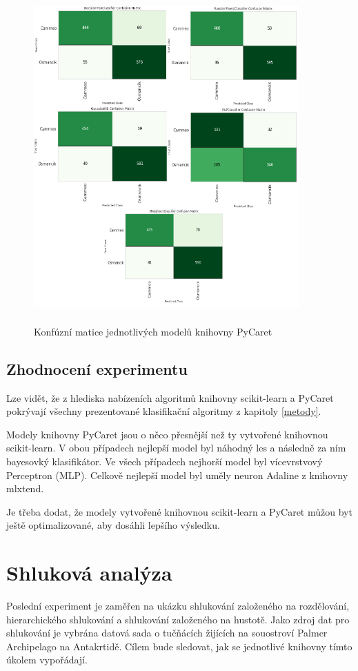\begin{figure}[h]\centering
  \centering
  \includegraphics[width=4in,height=4.7in]{obrazky/pycaretklf.pdf}\\[1pt]
  \caption{Konfúzní matice jednotlivých modelů knihovny PyCaret}
  \label{konfuznimaticepycaret}
\end{figure}

\subsection*{Zhodnocení experimentu}
Lze vidět, že z hlediska nabízeních algoritmů knihovny scikit-learn a PyCaret pokrývají všechny prezentované klasifikační algoritmy z kapitoly \ref{metody}. 

Modely knihovny PyCaret jsou o něco přesnější než ty vytvořené knihovnou scikit-learn. V obou případech nejlepší model byl náhodný les a následně za ním bayesovký klasifikátor. Ve všech případech nejhorší model byl vícevrstvový Perceptron (MLP). Celkově nejlepší model byl uměly neuron Adaline z knihovny mlxtend. 

Je třeba dodat, že modely vytvořené knihovnou scikit-learn a PyCaret můžou byt ještě optimalizované, aby dosáhli lepšího výsledku.

\section{Shluková analýza}
\label{shlukovanalyza}
Poslední experiment je zaměřen na ukázku shlukování založeného na rozdělování, hierarchického shlukování a shlukování založeného na hustotě. Jako zdroj dat pro shlukování je vybrána datová sada o tučňácích žijících na souostroví Palmer Archipelago na Antakrtidě. Cílem bude sledovat, jak se jednotlivé knihovny tímto
úkolem vypořádají. 

